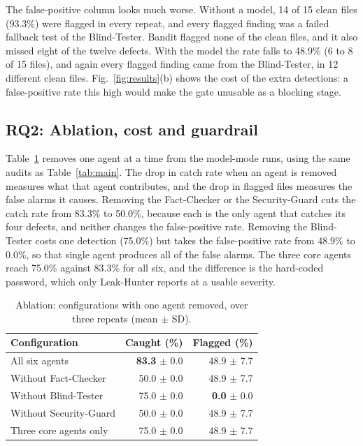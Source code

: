 \documentclass[12pt,onecolumn,draftclsnofoot]{IEEEtran}
\begin{document}
The false-positive column looks much worse. Without a model, 14 of 15 clean files (93.3\%) were flagged in every repeat, and every flagged finding was a failed fallback test of the Blind-Tester. Bandit flagged none of the clean files, and it also missed eight of the twelve defects. With the model the rate falls to 48.9\% (6 to 8 of 15 files), and again every flagged finding came from the Blind-Tester, in 12 different clean files. Fig.~\ref{fig:results}(b) shows the cost of the extra detections: a false-positive rate this high would make the gate unusable as a blocking stage.
\subsection{RQ2: Ablation, cost and guardrail}
Table~\ref{tab:ablation} removes one agent at a time from the model-mode runs, using the same audits as Table~\ref{tab:main}. The drop in catch rate when an agent is removed measures what that agent contributes, and the drop in flagged files measures the false alarms it causes. Removing the Fact-Checker or the Security-Guard cuts the catch rate from 83.3\% to 50.0\%, because each is the only agent that catches its four defects, and neither changes the false-positive rate. Removing the Blind-Tester costs one detection (75.0\%) but takes the false-positive rate from 48.9\% to 0.0\%, so that single agent produces all of the false alarms. The three core agents reach 75.0\% against 83.3\% for all six, and the difference is the hard-coded password, which only Leak-Hunter reports at a usable severity.
\begin{table}[htbp]\centering
\caption{Ablation: configurations with one agent removed, over three repeats (mean $\pm$ SD).}
\label{tab:ablation}\small
\begin{tabular}{@{}p{.40\linewidth}rr@{}}\toprule
Configuration & Caught (\%) & Flagged (\%)\\\midrule
All six agents & \textbf{83.3} $\pm$ 0.0 & 48.9 $\pm$ 7.7\\
Without Fact-Checker & 50.0 $\pm$ 0.0 & 48.9 $\pm$ 7.7\\
Without Blind-Tester & 75.0 $\pm$ 0.0 & \textbf{0.0} $\pm$ 0.0\\
Without Security-Guard & 50.0 $\pm$ 0.0 & 48.9 $\pm$ 7.7\\
Three core agents only & 75.0 $\pm$ 0.0 & 48.9 $\pm$ 7.7\\
\bottomrule\end{tabular}
\end{table}
\end{document}
